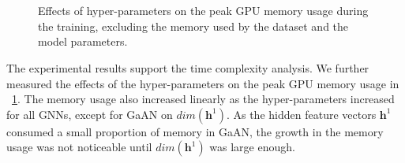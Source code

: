 \begin{figure}
    \centering
    \\
    \\
    \caption{Effects of hyper-parameters on the peak GPU memory usage during the training, excluding the memory used by the dataset and the model parameters.}
    \label{fig:exp_hyperparameter_memory_usage}
\end{figure}

The experimental results support the time complexity analysis.
We further measured the effects of the hyper-parameters on the peak GPU memory usage in \figurename~\ref{fig:exp_hyperparameter_memory_usage}.
The memory usage also increased linearly as the hyper-parameters increased for all GNNs, except for GaAN on $dim(\boldsymbol{h}^1)$.
As the hidden feature vectors $\boldsymbol{h}^1$ consumed a small proportion of memory in GaAN, the growth in the memory usage was not noticeable until $dim(\boldsymbol{h}^1)$ was large enough.

